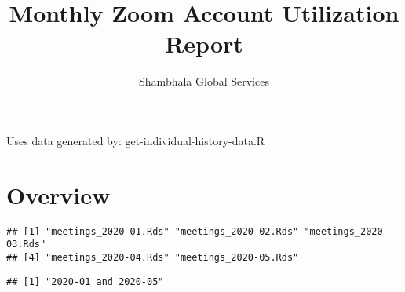 \documentclass[
]{article}
\title{Monthly Zoom Account Utilization Report}
\author{Shambhala Global Services}
\date{}
\begin{document}
\maketitle

Uses data generated by: get-individual-history-data.R

\hypertarget{overview}{%
\section{Overview}\label{overview}}

\begin{verbatim}
## [1] "meetings_2020-01.Rds" "meetings_2020-02.Rds" "meetings_2020-03.Rds"
## [4] "meetings_2020-04.Rds" "meetings_2020-05.Rds"
\end{verbatim}

\begin{verbatim}
## [1] "2020-01 and 2020-05"
\end{verbatim}
\end{document}
